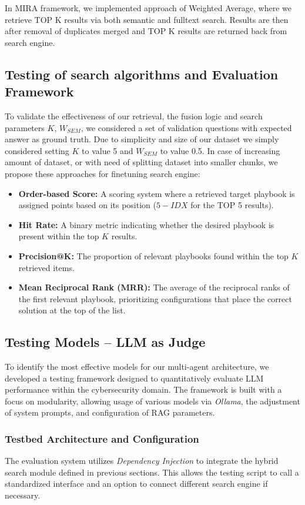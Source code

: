 \documentclass[conference]{IEEEtran}
\begin{document}
In MIRA framework, we implemented approach of Weighted Average, where we retrieve TOP K results via both semantic and fulltext search. 
Results are then after removal of duplicates merged and TOP K results are returned back from search engine.  

\subsection{Testing of search algorithms and Evaluation Framework}
To validate the effectiveness of our retrieval, the fusion logic and search parameters $K$, $W_{SEM}$, we considered a set of validation questions with expected answer as ground truth. 
Due to simplicity and size of our dataset we simply considered setting $K$ to value 5 and $W_{SEM}$ to value 0.5. In case of increasing amount of dataset, or with need of 
splitting dataset into smaller chunks, we propose these approaches for finetuning search engine:

\begin{itemize}
    \item \textbf{Order-based Score:} A scoring system where a retrieved target playbook is assigned points based on its position ($5 - IDX$ for the TOP 5 results).
    \item \textbf{Hit Rate:} A binary metric indicating whether the desired playbook is present within the top $K$ results.
    \item \textbf{Precision@K:} The proportion of relevant playbooks found within the top $K$ retrieved items.
    \item \textbf{Mean Reciprocal Rank (MRR):} The average of the reciprocal ranks of the first relevant playbook, prioritizing configurations that place the correct solution at the top of the list.
\end{itemize}


\subsection{Testing Models – LLM as Judge}

To identify the most effective models for our multi-agent architecture, we developed a testing framework designed to quantitatively evaluate LLM performance 
within the cybersecurity domain. The framework is built with a focus on modularity, allowing usage of various models via \textit{Ollama}, 
the adjustment of system prompts, and configuration of RAG parameters.

\subsubsection{Testbed Architecture and Configuration}
The evaluation system utilizes \textit{Dependency Injection} to integrate the hybrid search module defined in previous sections. 
This allows the testing script to call a standardized interface and an option to connect different search engine if necessary.
\end{document}
